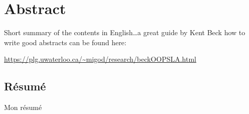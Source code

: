 \documentclass[../thesis.tex]{subfiles}
\begin{document}
\begingroup
\let\clearpage\relax
\let\cleardoublepage\relax
\let\cleardoublepage\relax

\chapter*{Abstract}
Short summary of the contents in English\dots a great guide by
Kent Beck how to write good abstracts can be found here:
\begin{center}
\url{https://plg.uwaterloo.ca/~migod/research/beckOOPSLA.html}
\end{center}

\vfill

\begin{otherlanguage}{french}
\chapter*{Résumé}
Mon résumé
\end{otherlanguage}

\endgroup

\vfill
\end{document}
